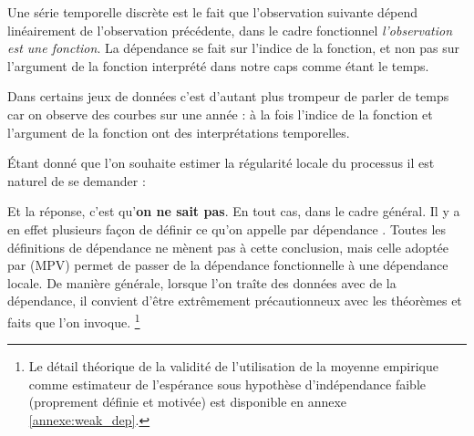 
Une série temporelle discrète est le fait que l'observation suivante dépend linéairement de l'observation précédente, dans le cadre fonctionnel \emph{l'observation est une fonction}. La dépendance se fait sur l'indice de la fonction, et non pas sur l'argument de la fonction interprété dans notre caps comme étant le temps.

\bigskip

Dans certains jeux de données c'est d'autant plus trompeur de parler de temps car on observe des courbes sur une année : à la fois l'indice de la fonction et l'argument de la fonction ont des interprétations temporelles.

\smallskip

\noindent{}

\bigskip

\noindent Étant donné que l'on souhaite estimer la régularité locale du processus il est naturel de se demander :

\noindent Et la réponse, c'est qu'\textbf{on ne sait pas}. En tout cas, dans le cadre général. Il y a en effet plusieurs façon de définir ce qu'on appelle par \og dépendance \fg. Toutes les définitions de dépendance ne mènent pas à cette conclusion, mais celle adoptée par (MPV) permet de passer de la dépendance fonctionnelle à une dépendance locale. De manière générale, lorsque l'on traîte des données avec de la dépendance, il convient d'être extrêmement précautionneux avec les théorèmes et \og faits \fg que l'on invoque. \footnote{Le détail théorique de la validité de l'utilisation de la moyenne empirique comme estimateur de l'espérance sous hypothèse d'indépendance faible (proprement définie et motivée) est disponible en annexe \ref{annexe:weak_dep}.}